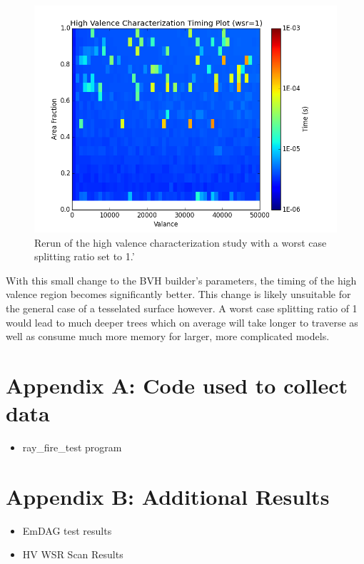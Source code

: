 \documentclass[10pt, a4paper]{article}
\begin{document}
  
\begin{figure}[H]
  \centering
    \includegraphics[scale=0.35]{hv_study_MOAB_wsr1.png}
    \caption{Rerun of the high valence characterization study with a worst case splitting ratio set to 1.'}
\end{figure}


With this small change to the BVH builder's parameters, the timing of the high valence region becomes significantly better. This change is likely unsuitable for the general case of a tesselated surface however. A worst case splitting ratio of 1 would lead to much deeper trees which on average will take longer to traverse as well as consume much more memory for larger, more complicated models.







\section{Appendix A: Code used to collect data}%
\begin{itemize}
\item ray\_fire\_test program
\end{itemize}

\section{Appendix B: Additional Results}%
\begin{itemize}
\item EmDAG test results
\item HV WSR Scan Results
\end{itemize}
\end{document}
